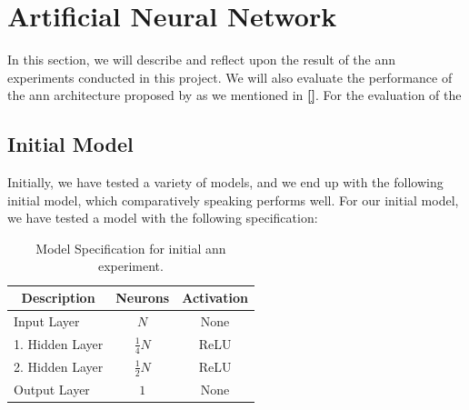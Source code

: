\section{Artificial Neural Network} 
In this section, we will describe and reflect upon the result of the \gls{ann} experiments conducted in this project. We will also evaluate the performance of the \gls{ann} architecture proposed by \cite{} as we mentioned in \textbf{\autoref{}}. For the evaluation of the 
 
\subsection{Initial Model}
Initially, we have tested a variety of models, and we end up with the following initial model, which comparatively speaking performs well.
For our initial model, we have tested a model with the following specification:

\begin{table}[H]
    \centering
    \caption{Model Specification for initial \gls{ann} experiment.}
    \begin{tabular}{m{}m{} m{}}
        \hline
        \multicolumn{1}{c}{\textbf{Description}} & \multicolumn{1}{c}{\textbf{Neurons}} & \multicolumn{1}{c}{\textbf{Activation}}\\
        \hline
        
        Input Layer         &   \multicolumn{1}{c}{$N$} & \multicolumn{1}{c}{None}        \\
        1. Hidden Layer     &   \multicolumn{1}{c}{$\frac{1}{4}N$}  & \multicolumn{1}{c}{ReLU}     \\
        2. Hidden Layer     &   \multicolumn{1}{c}{$\frac{1}{2}N$}  & \multicolumn{1}{c}{ReLU}     \\
        Output Layer     &   \multicolumn{1}{c}{$1$}  & \multicolumn{1}{c}{None}     \\
        \hline
    \end{tabular}
    \label{tab:NN01}
\end{table}

